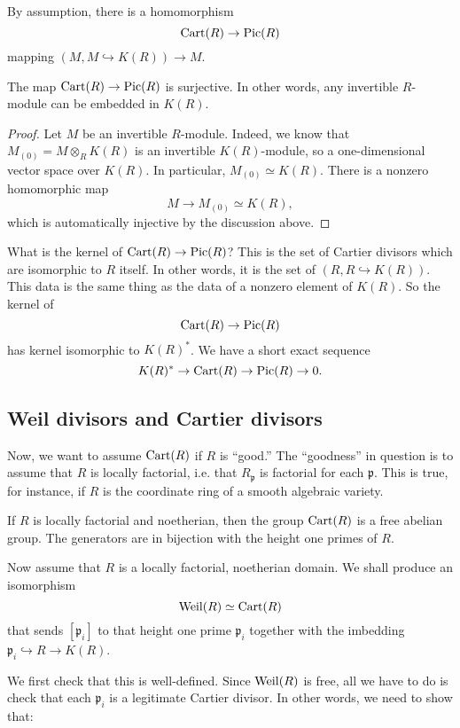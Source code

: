 By assumption, there is a homomorphism
\[ \operatorname{Cart}(R) \to\operatorname{Pic}(R)  \]
mapping $(M, M \hookrightarrow K(R)) \to M$. 

\begin{proposition} 
The map $\operatorname{Cart}(R) \to \operatorname{Pic}(R)$ is surjective. In other words, any invertible
$R$-module can be embedded in $K(R)$.
\end{proposition} 
\begin{proof}  Let $M$ be an invertible $R$-module.
Indeed, we know that $M_{(0)} = M \otimes_R K(R)$ is an invertible
$K(R)$-module, so a one-dimensional vector space over $K(R)$. In particular,
$M_{(0)} \simeq K(R)$. There is a nonzero homomorphic map
\[  M \to M_{(0) } \simeq K(R),  \]
which is automatically injective by the discussion above. 
\end{proof} 

What is the kernel of $\operatorname{Cart}(R) \to \operatorname{Pic}(R)$? This is the set of Cartier divisors which are
isomorphic to $R$ itself. In other words, it is the set of $(R, R
\hookrightarrow K(R))$. This data is the same thing as the data of a nonzero
element of $K(R)$. 
So the kernel of 
\[  \operatorname{Cart}(R) \to \operatorname{Pic}(R)  \]
has kernel isomorphic to $K(R)^*$. We have a short exact sequence
\[  K(R)^* \to \operatorname{Cart}(R) \to \operatorname{Pic}(R) \to 0.  \]

\subsection{Weil divisors and Cartier divisors}

Now, we want to assume $\operatorname{Cart}(R)$ if $R$ is ``good.'' The ``goodness'' in
question is to assume that $R$ is locally factorial, i.e. that
$R_{\mathfrak{p}}$ is factorial for each $\mathfrak{p}$. This is true, for
instance, if $R$ is the coordinate ring of a smooth algebraic variety.



\begin{proposition} 
If $R$ is locally factorial and noetherian, then the group $\operatorname{Cart}(R)$ is a free abelian group.
The generators are in bijection with the height one primes of $R$.
\end{proposition} 
Now assume that $R$ is a locally factorial, noetherian domain. 
We shall produce an isomorphism
\[ \operatorname{Weil}(R) \simeq \operatorname{Cart}(R)  \]
that sends $[\mathfrak{p}_i]$ to that height one prime $\mathfrak{p}_i$
together with the imbedding $\mathfrak{p}_i \hookrightarrow R \to K(R)$. 

We first check that this is well-defined. Since $\operatorname{Weil}(R)$ is free, all we have
to do is check that each $\mathfrak{p}_i$ is a legitimate Cartier divisor. In
other words, we need to show that:

